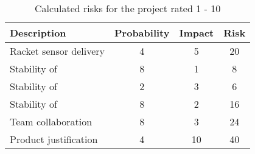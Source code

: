 \begin{table}
\caption{Calculated risks for the project rated 1 - 10}
\label{tbl:risk}
\begin{tabularx}{\textwidth}{|l|C|C|C|}
\hline
\textbf{Description} & \textbf{Probability} & \textbf{Impact} & \textbf{Risk} \\
\hline
Racket sensor delivery      & 4 &  5 & 20 \\
Stability of      & 8 &  1 &  8 \\
Stability of  & 2 &  3 &  6 \\
Stability of   & 8 &  2 & 16 \\
Team collaboration          & 8 &  3 & 24 \\
Product justification       & 4 & 10 & 40 \\
\hline
\end{tabularx}
\end{table}

